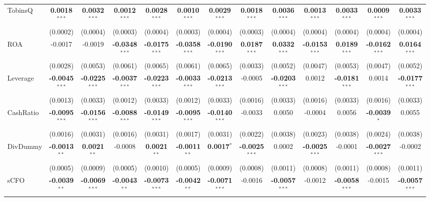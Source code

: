 \begin{landscape}
\begin{table}[H]
\begin{tabular}{lcccccccccccc}
TobinsQ & \textbf{0.0018}$^{***}$ & \textbf{0.0032}$^{***}$ & \textbf{0.0012}$^{***}$ & \textbf{0.0028}$^{***}$ & \textbf{0.0010}$^{***}$ & \textbf{0.0029}$^{***}$ & \textbf{0.0018}$^{***}$ & \textbf{0.0036}$^{***}$ & \textbf{0.0013}$^{***}$ & \textbf{0.0033}$^{***}$ & \textbf{0.0009}$^{***}$ & \textbf{0.0033}$^{***}$ \\
 & (0.0002) & (0.0004) & (0.0003) & (0.0004) & (0.0003) & (0.0004) & (0.0003) & (0.0004) & (0.0004) & (0.0004) & (0.0004) & (0.0004) \\
ROA & -0.0017 & -0.0019 & \textbf{-0.0348}$^{***}$ & \textbf{-0.0175}$^{***}$ & \textbf{-0.0358}$^{***}$ & \textbf{-0.0190}$^{***}$ & \textbf{0.0187}$^{***}$ & \textbf{0.0332}$^{***}$ & \textbf{-0.0153}$^{***}$ & \textbf{0.0189}$^{***}$ & \textbf{-0.0162}$^{***}$ & \textbf{0.0164}$^{***}$ \\
 & (0.0028) & (0.0053) & (0.0061) & (0.0065) & (0.0061) & (0.0065) & (0.0033) & (0.0052) & (0.0047) & (0.0053) & (0.0047) & (0.0052) \\
Leverage & \textbf{-0.0045}$^{***}$ & \textbf{-0.0225}$^{***}$ & \textbf{-0.0037}$^{***}$ & \textbf{-0.0223}$^{***}$ & \textbf{-0.0033}$^{***}$ & \textbf{-0.0213}$^{***}$ & -0.0005 & \textbf{-0.0203}$^{***}$ & 0.0012 & \textbf{-0.0181}$^{***}$ & 0.0014 & \textbf{-0.0177}$^{***}$ \\
 & (0.0013) & (0.0033) & (0.0012) & (0.0033) & (0.0012) & (0.0033) & (0.0016) & (0.0033) & (0.0016) & (0.0033) & (0.0016) & (0.0033) \\
CashRatio & \textbf{-0.0095}$^{***}$ & \textbf{-0.0156}$^{***}$ & \textbf{-0.0088}$^{***}$ & \textbf{-0.0149}$^{***}$ & \textbf{-0.0095}$^{***}$ & \textbf{-0.0140}$^{***}$ & -0.0033 & 0.0050 & -0.0004 & 0.0056 & \textbf{-0.0039}$^{*}$ & 0.0055 \\
 & (0.0016) & (0.0031) & (0.0016) & (0.0031) & (0.0017) & (0.0031) & (0.0022) & (0.0038) & (0.0023) & (0.0038) & (0.0024) & (0.0038) \\
DivDummy & \textbf{-0.0013}$^{**}$ & \textbf{0.0021}$^{**}$ & -0.0008 & \textbf{0.0021}$^{**}$ & \textbf{-0.0011}$^{**}$ & \textbf{0.0017}$^{*}$ & \textbf{-0.0025}$^{***}$ & 0.0002 & \textbf{-0.0025}$^{***}$ & -0.0001 & \textbf{-0.0027}$^{***}$ & -0.0002 \\
 & (0.0005) & (0.0009) & (0.0005) & (0.0010) & (0.0005) & (0.0009) & (0.0008) & (0.0011) & (0.0008) & (0.0011) & (0.0008) & (0.0011) \\
sCFO & \textbf{-0.0039}$^{**}$ & \textbf{-0.0069}$^{***}$ & \textbf{-0.0043}$^{**}$ & \textbf{-0.0073}$^{***}$ & \textbf{-0.0042}$^{**}$ & \textbf{-0.0071}$^{***}$ & -0.0016 & \textbf{-0.0057}$^{***}$ & -0.0012 & \textbf{-0.0058}$^{***}$ & -0.0015 & \textbf{-0.0057}$^{***}$ \\

\end{tabular}
\end{table}
\end{landscape}
